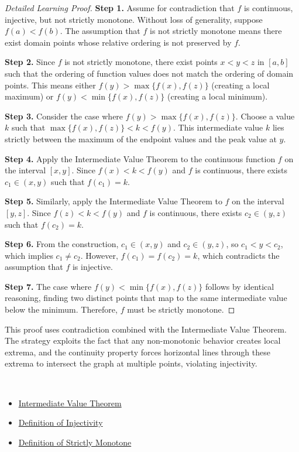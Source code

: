 \begin{proof}[Detailed Learning Proof]
\LRAProofBodyStart

\textbf{Step 1.} Assume for contradiction that $f$ is continuous, injective, but not strictly monotone. Without loss of generality, suppose $f(a) < f(b)$. The assumption that $f$ is not strictly monotone means there exist domain points whose relative ordering is not preserved by $f$.

\textbf{Step 2.} Since $f$ is not strictly monotone, there exist points $x < y < z$ in $[a,b]$ such that the ordering of function values does not match the ordering of domain points. This means either $f(y) > \max\{f(x), f(z)\}$ (creating a local maximum) or $f(y) < \min\{f(x), f(z)\}$ (creating a local minimum).

\textbf{Step 3.} Consider the case where $f(y) > \max\{f(x), f(z)\}$. Choose a value $k$ such that $\max\{f(x), f(z)\} < k < f(y)$. This intermediate value $k$ lies strictly between the maximum of the endpoint values and the peak value at $y$.

\textbf{Step 4.} Apply the Intermediate Value Theorem to the continuous function $f$ on the interval $[x, y]$. Since $f(x) < k < f(y)$ and $f$ is continuous, there exists $c_1 \in (x, y)$ such that $f(c_1) = k$.

\textbf{Step 5.} Similarly, apply the Intermediate Value Theorem to $f$ on the interval $[y, z]$. Since $f(z) < k < f(y)$ and $f$ is continuous, there exists $c_2 \in (y, z)$ such that $f(c_2) = k$.

\textbf{Step 6.} From the construction, $c_1 \in (x, y)$ and $c_2 \in (y, z)$, so $c_1 < y < c_2$, which implies $c_1 \neq c_2$. However, $f(c_1) = f(c_2) = k$, which contradicts the assumption that $f$ is injective.

\textbf{Step 7.} The case where $f(y) < \min\{f(x), f(z)\}$ follows by identical reasoning, finding two distinct points that map to the same intermediate value below the minimum. Therefore, $f$ must be strictly monotone.
\end{proof}

\begin{remark*}
This proof uses contradiction combined with the Intermediate Value Theorem. The strategy exploits the fact that any non-monotonic behavior creates local extrema, and the continuity property forces horizontal lines through these extrema to intersect the graph at multiple points, violating injectivity.
\end{remark*}

\begin{remark*}[Dependencies]~\\
\begin{itemize}
  \item \hyperref[thm:ivt]{Intermediate Value Theorem}
  \item \hyperref[def:injectivity]{Definition of Injectivity}
  \item \hyperref[def:strict-monotone]{Definition of Strictly Monotone}
\end{itemize}
\end{remark*}
